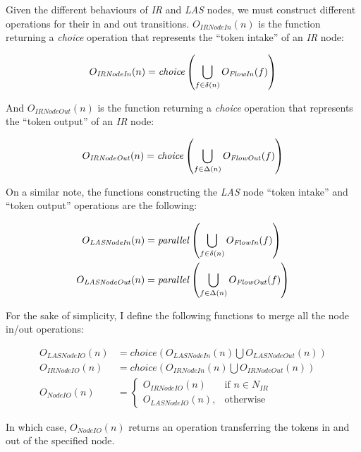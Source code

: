 \begin{definition}
	Given the different behaviours of \emph{IR} and \emph{LAS} nodes, we must construct different operations for their in and out transitions. \(O_\mathit{IRNodeIn}(n)\) is the function returning a \emph{choice} operation that represents the ``token intake'' of an \emph{IR} node:
	
	\begin{equation*}
		O_\mathit{IRNodeIn}(n) = \mathit{choice}\left(\bigcup_{f \in \delta(n)} O_\mathit{FlowIn}(f)\right)
	\end{equation*}
	
	And \(O_\mathit{IRNodeOut}(n)\) is the function returning a \emph{choice} operation that represents the ``token output'' of an \emph{IR} node:

	\begin{equation*}
		O_\mathit{IRNodeOut}(n) = \mathit{choice}\left(\bigcup_{f \in \Delta(n)} O_\mathit{FlowOut}(f)\right)
	\end{equation*}

	On a similar note, the functions constructing the \emph{LAS} node ``token intake'' and \enquote{token output} operations are the following:
	
	\begin{align*}
		O_\mathit{LASNodeIn}(n) &= \mathit{parallel}\left(\bigcup_{f \in \delta(n)} O_\mathit{FlowIn}(f)\right)\\
		O_\mathit{LASNodeOut}(n) &= \mathit{parallel}\left(\bigcup_{f \in \Delta(n)} O_\mathit{FlowOut}(f)\right)
	\end{align*}

	For the sake of simplicity, I define the following functions to merge all the node in/out operations:

	\begin{align*}
		O_\mathit{LASNodeIO}(n) &= \mathit{choice}\left(O_\mathit{LASNodeIn}(n) \bigcup O_\mathit{LASNodeOut}(n)\right)\\
		O_\mathit{IRNodeIO}(n) &= \mathit{choice}\left(O_\mathit{IRNodeIn}(n) \bigcup O_\mathit{IRNodeOut}(n)\right)\\
		O_\mathit{NodeIO}(n) &= 
		\begin{cases}
			O_\mathit{IRNodeIO}(n) & \text{if } n \in N_{IR} \\
			O_\mathit{LASNodeIO}(n), & \text{otherwise}
		\end{cases}
	\end{align*}

	In which case, \(O_\mathit{NodeIO}(n)\) returns an operation transferring the tokens in and out of the specified node. 

\end{definition}


